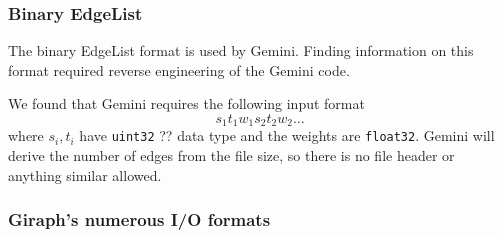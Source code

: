 \subsubsection{Binary EdgeList}
The binary EdgeList format is used by Gemini. Finding information on this format required reverse engineering of the Gemini code.

We found that Gemini requires the following input format
\begin{equation*}
	s_1t_1w_1s_2t_2w_2\ldots
\end{equation*}
where $s_i,t_i$ have \texttt{uint32} ?? data type and the weights are \texttt{float32}. 
Gemini will derive the number of edges from the file size, so there is no file header or anything similar allowed.

\subsubsection{Giraph's numerous I/O formats}
